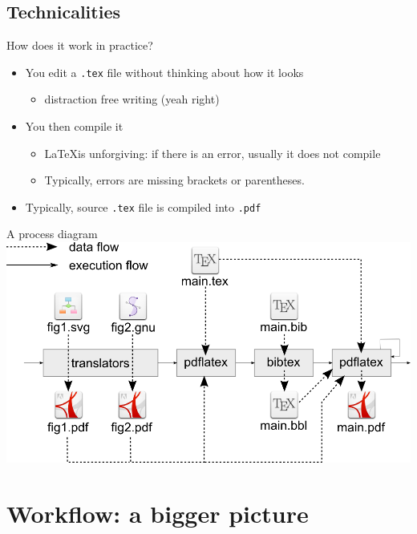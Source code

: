 \documentclass[ignorenonframetext,]{beamer}
\begin{document}
\subsection{Technicalities}\label{technicalities}

\begin{frame}{How does it work in practice?}

\begin{itemize}
\item
  You edit a \texttt{.tex} file without thinking about how it looks

  \begin{itemize}
  \itemsep1pt\parskip0pt
  \item
    distraction free writing (yeah right)
  \end{itemize}
\item
  You then compile it

  \begin{itemize}
  \itemsep1pt\parskip0pt
  \item
    \LaTeX is unforgiving: if there is an error, usually it does not
    compile
  \item
    Typically, errors are missing brackets or parentheses.
  \end{itemize}
\item
  Typically, source \texttt{.tex} file is compiled into \texttt{.pdf}
\end{itemize}

\end{frame}

\begin{frame}{A process diagram}
\centering
\includegraphics{fig/process.png}

\end{frame}

\section{Workflow: a bigger picture}\label{workflow-a-bigger-picture}
\end{document}
